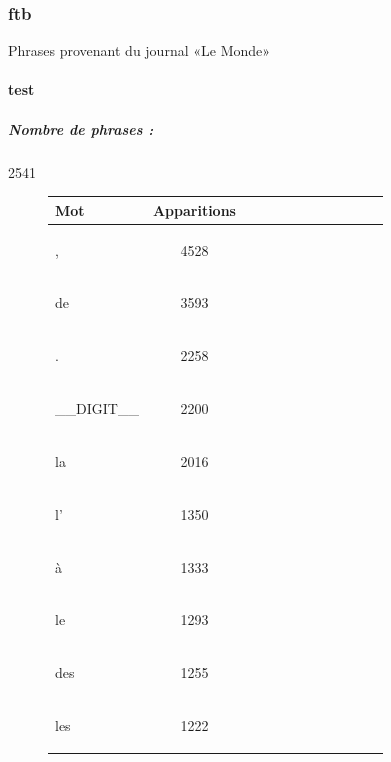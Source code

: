 \subsubsection{ftb } 
 Phrases provenant du journal «Le Monde»

 \paragraph{test } 
\subparagraph{Nombre de phrases :} 2541\\ 
\begin{figure}[H] \begin{minipage}{0.48\textwidth} \centering \begin{tabular}{|l || *{11 }{|c} |} \hline
Mot & Apparitions  \\ \hline
\begin{verb} , \end{verb} &4528\\ \hline
\begin{verb} de \end{verb} &3593\\ \hline
\begin{verb} . \end{verb} &2258\\ \hline
\begin{verb} __DIGIT__ \end{verb} &2200\\ \hline
\begin{verb} la \end{verb} &2016\\ \hline
\begin{verb} l' \end{verb} &1350\\ \hline
\begin{verb} à \end{verb} &1333\\ \hline
\begin{verb} le \end{verb} &1293\\ \hline
\begin{verb} des \end{verb} &1255\\ \hline
\begin{verb} les \end{verb} &1222\\ \hline


\end{tabular}
\end{minipage}
\end{figure}
